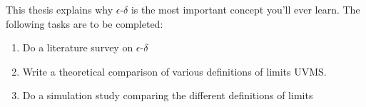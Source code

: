 This thesis explains why $\epsilon$-$\delta$ is the most important concept you'll ever learn.
The following tasks are to be completed:
\begin{enumerate}
\item Do a literature survey on $\epsilon$-$\delta$
\item Write a theoretical comparison of various definitions of limits
UVMS.
\item Do a simulation study comparing the different definitions of limits
\end{enumerate}
